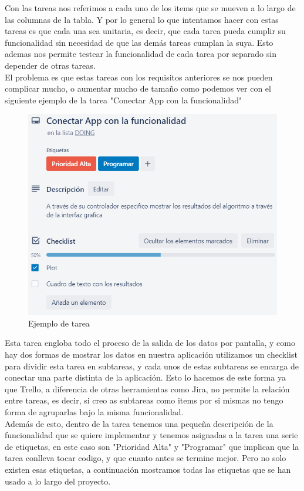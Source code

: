 \documentclass[12pt,a4paper]{article}
\begin{document}
	Con las tareas nos referimos a cada uno de los items que se mueven a lo largo de las columnas de la tabla. Y por lo general lo que intentamos hacer con estas tareas es que cada una sea unitaria, es decir, que cada tarea pueda cumplir su funcionalidad sin necesidad de que las demás tareas cumplan la suya. Esto ademas nos permite testear la funcionalidad de cada tarea por separado sin depender de otras tareas.\\
	El problema es que estas tareas con los requisitos anteriores se nos pueden complicar mucho, o aumentar mucho de tamaño como podemos ver con el siguiente ejemplo de la tarea "Conectar App con la funcionalidad"\\
\begin{figure}[H]
\centering
  \centering
  \includegraphics[width=1\linewidth]{trello tarea}
\caption{Ejemplo de tarea}
\label{fig:subrgrafo}
\end{figure}
	Esta tarea engloba todo el proceso de la salida de los datos por pantalla, y como hay dos formas de mostrar los datos en nuestra aplicación utilizamos un checklist para dividir esta tarea en subtareas, y cada unos de estas subtareas se encarga de conectar una parte distinta de la aplicación. Esto lo hacemos de este forma ya que Trello, a diferencia de otras herramientas como Jira, no permite la relación entre tareas, es decir, si creo as subtareas como items por si mismas no tengo forma de agruparlas bajo la misma funcionalidad.\\
	Además de esto, dentro de la tarea tenemos una pequeña descripción de la funcionalidad que se quiere implementar y tenemos asignadas a la tarea una serie de etiquetas, en este caso son "Prioridad Alta" y "Programar" que implican que la tarea conlleva tocar codigo, y que cuanto antes se termine mejor. Pero no solo existen esas etiquetas, a continuación mostramos todas las etiquetas que se han usado a lo largo del proyecto.\\
\end{document}
